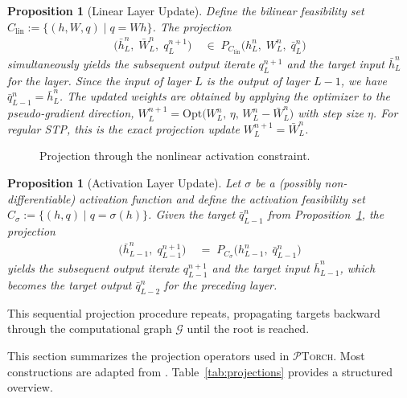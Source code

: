 \documentclass{article}
\theoremstyle{plain}
\newtheorem{proposition}[theorem]{Proposition}
\theoremstyle{definition}
\theoremstyle{remark}
\begin{document}
\begin{proposition}[Linear Layer Update]
\label{prop:linear-layer}
Define the bilinear feasibility set $C_{\mathrm{lin}} := \{(h, W, q) \mid q = Wh\}$. The projection
\begin{align}
\bigl(\bar{h}_{L}^{n},\; \bar{W}_L^{n},\; q_L^{n+1}\bigr)
  &\;\in\; P_{C_{\mathrm{lin}}}\!\bigl(h_{L}^{n},\; W_L^{n},\; \bar{q}_L^n\bigr)
\end{align}
simultaneously yields the subsequent output iterate $q_L^{n+1}$ and the target input $\bar{h}_{L}^{n}$ for the layer. Since the input of layer $L$ is the output of layer $L{-}1$, we have $\bar{q}_{L-1}^{n} = \bar{h}_{L}^{n}$. The updated weights are obtained by applying the optimizer to the pseudo-gradient direction, $W_L^{n+1} = \mathrm{Opt}\!\bigl(W_L^{n},\,\eta,\,W_L^{n}-\bar{W}_L^{n}\bigr)$ with step size $\eta$. For regular STP, this is the exact projection update $W_L^{n+1} = \bar{W}_L^{n}$.

\end{proposition}

\begin{figure}[htbp]
\centering
\resizebox{0.78\textwidth}{!}{%

}
\caption{Projection through the nonlinear activation constraint.}
\label{fig:next_back_prop_mid}
\end{figure}

\begin{proposition}[Activation Layer Update]
\label{prop:activation-layer}
Let $\sigma$ be a (possibly non-differentiable) activation function and define the activation feasibility set $C_{\sigma} := \{(h, q) \mid q = \sigma(h)\}$. Given the target $\bar{q}_{L-1}^{n}$ from Proposition~\ref{prop:linear-layer}, the projection
\begin{align}
\bigl(\bar{h}_{L-1}^{n},\; q_{L-1}^{n+1}\bigr)
&\;=\; P_{C_{\sigma}}\!\bigl(h_{L-1}^{n},\; \bar{q}_{L-1}^{n}\bigr)
\end{align}
yields the subsequent output iterate $q_{L-1}^{n+1}$ and the target input $\bar{h}_{L-1}^{n}$, which becomes the target output $\bar{q}_{L-2}^{n}$ for the preceding layer.
\end{proposition}

This sequential projection procedure repeats, propagating targets backward through the computational graph $\mathcal{G}$ until the root is reached.

This section summarizes the projection operators used in \textsc{$\mathcal{P}$Torch}. 
Most constructions are adapted from \cite{bergmeister2025projection, elser2019learning}. 
Table~\ref{tab:projections} provides a structured overview.
\end{document}

